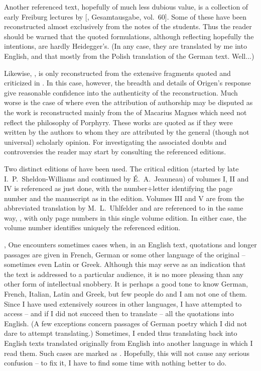 Another referenced text, hopefully of much less dubious value, is a collection
of early Freiburg lectures by \citeauthor*{PhenomReligio} [, Gesamtausgabe, vol.~60]. Some of these have been
reconstructed almost exclusively from the notes of the students. Thus the reader
should be warned that the quoted formulations, although reflecting hopefully the
intentions, are hardly Heidegger's. (In any case, they are translated by me into
English, and that mostly from the Polish translation of the German text. Well...)

Likewise, \citeauthor*{Celsus}, is only reconstructed from the extensive
fragments quoted and criticized in \citeauthor*{aCelsus}. In this case, however,
the breadth and details of Origen's response give reasonable confidence into the
authenticity of the reconstruction. Much worse is the case of
\citeauthor*{Porphyry} where even the attribution of authorship may be disputed
as the work is reconstructed mainly from the  of Macarius
Magnes which need not reflect the philosophy of Porphyry. These works are quoted
as if they were written by the authors to whom they are attributed by the
general (though not universal) scholarly opinion. For investigating the
associated doubts and controversies the reader may start by consulting the
referenced editions.

Two distinct editions of \citeauthor*{Periphyseon} have been used. The critical
edition (started by late I.~P.~Sheldon-Williams and continued by
\'{E}.~A.~Jeauneau) of volumes I, II and IV is referenced as just done, with the
number+letter identifying the page number and the manuscript as in the edition.
Volumes III and V are from the abbreviated translation by M.~L.~Uhlfelder and
are referenced to in the same way, \citeauthor*{Periphy}, with only page numbers
in this single volume edition. In either case, the volume number identifies
uniquely the referenced edition. 


\sep
%
One encounters sometimes cases when, in an English text, quotations and longer
passages are given in French, German or some other language of the original --
sometimes even Latin or 
Greek. Although this may serve as an indication that the text is addressed to a
particular audience, it is no more pleasing than any other form of intellectual
snobbery.  It is perhaps a good tone to know German, French, Italian, Latin and
Greek, but few people do and I am not one of them. Since I have used extensively
sources in other languages, I have attempted to access -- and if I did not
succeed then to translate -- all the quotations into English. (A few exceptions
concern passages of German poetry which I did not dare to attempt translating.)
Sometimes, I ended thus translating back into English texts translated
originally from English into another language in which I read them. Such cases
are marked as .  Hopefully, this will not cause
any serious confusion -- to fix it, I have to find some time with nothing better
to do.

